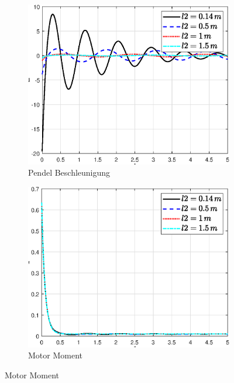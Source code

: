 \begin{figure}
\begin{subfigure}[b]{0.49 \linewidth}
        \label{fig:l2_phi_punkt_punkt}
    \end{subfigure}
    \begin{subfigure}[b]{0.49 \linewidth}
        \includegraphics[width=\linewidth]{plot_data/parameter/fig/l2/theta_punkt_punkt.eps}
        \caption{Pendel Beschleunigung}
        \label{fig:l2_theta_punkt_punkt}
    \end{subfigure}
    \begin{subfigure}[b]{0.49\linewidth}
        \includegraphics[width=\linewidth]{plot_data/parameter/fig/l2/tau.eps}
        \caption{Motor Moment}
        \label{fig:l2_tau}
    \end{subfigure}

\end{figure}
